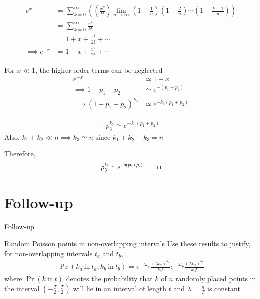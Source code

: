 \documentclass{beamer}
\providecommand{\pr}[1]{\ensuremath{\Pr\left(#1\right)}}
\providecommand{\brak}[1]{\ensuremath{\left(#1\right)}}
\begin{document}
	\begin{frame}
	\begin{align}
		e^x &= \sum_{k=0}^{\infty} \brak{\brak{\frac{x^k}{k!}} \lim_{n \to \infty} \brak{1-\frac1n} \brak{1-\frac2n} \cdots \brak{1 - \frac{k-1}{n}}} \\
		&= \sum_{k=0}^{\infty} \frac{x^k}{k!} \\
		&= 1 + x + \frac{x^2}{2!} + \cdots \\
		\implies e^{-x} &= 1 - x + \frac{x^2}{2!} + \cdots
	\end{align}
	
	For $x \ll 1$, the higher-order terms can be neglected
	\begin{align}
		e^{-x} &\simeq 1 - x \\
		\implies 1 - p_1 - p_2 &\simeq e^{-(p_1 + p_2)} \\
		\implies (1 - p_1 - p_2)^{k_3} &\simeq e^{-k_3(p_1 + p_2)}
	\end{align}
	\end{frame}
	
	\begin{frame}
	\begin{align}
		\therefore p_3^{k_3} \simeq e^{-k_3(p_1 + p_2)}
	\end{align}
	Also, $k_1 + k_2 \ll n \implies k_3 \simeq n$ since $k_1 + k_2 + k_3 = n$
	
	\begin{block}{}
	Therefore,
		\begin{align}
			p_3^{k_3} \simeq e^{-n(p_1 + p_2)} \qed
		\end{align}
	\end{block}
	\end{frame}
	
	\section{Follow-up}
	\begin{frame}{Follow-up}
	\begin{block}{Random Poisson points in non-overlapping intervals}
	Use these results to justify, for non-overlapping intervals $t_a$ and $t_b$,
		\begin{align}
			\pr{k_a~\mathrm{in}~t_a, k_b~\mathrm{in}~t_b} = e^{-\lambda t_a} \frac{(\lambda t_a)^{k_a}}{k_a!} e^{-\lambda t_b} \frac{(\lambda t_b)^{k_b}}{k_b!}
		\end{align}
		where $\pr{k~\mathrm{in}~t}$ denotes the probability that $k$ of $n$ randomly placed points in the interval $\brak{-\frac{T}{2}, \frac{T}{2}}$ will lie in an interval of length $t$ and $\lambda = \frac{n}{T}$ is constant
	\end{block}
	\end{frame}
	
\end{document}
